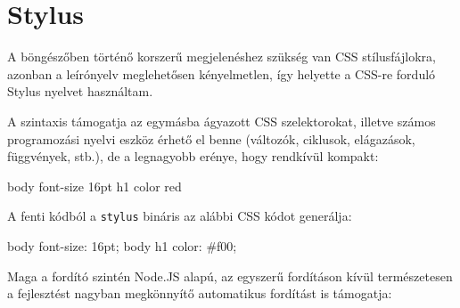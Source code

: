 \section{Stylus}

A böngészőben történő korszerű megjelenéshez szükség van CSS stílusfájlokra,
azonban a leírónyelv meglehetősen kényelmetlen, így helyette a CSS-re forduló
Stylus\cite{Stylus} nyelvet használtam.

A szintaxis támogatja az egymásba ágyazott CSS szelektorokat, illetve
számos programozási nyelvi eszköz érhető el benne
(változók, ciklusok, elágazások, függvények, stb.),
de a legnagyobb erénye, hogy rendkívül kompakt:

\begin{stylus}
body
  font-size 16pt
  h1
    color red
\end{stylus}

A fenti kódból a \verb=stylus= bináris az alábbi CSS kódot generálja:

\begin{css}
body {
  font-size: 16pt;
}
body h1 {
  color: #f00;
}
\end{css}

Maga a fordító szintén Node.JS alapú, az egyszerű fordításon kívül
természetesen a fejlesztést nagyban megkönnyítő automatikus fordítást is
támogatja:

